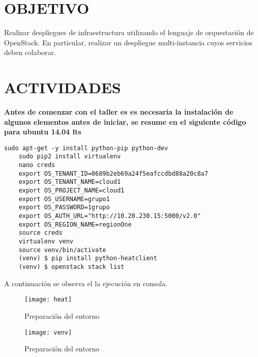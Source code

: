 \documentclass[10pt]{article}   			%
\begin{document}
	
\section{OBJETIVO}
Realizar despliegues de infraestructura utilizando el lenguaje de orquestación de OpenStack. En particular, realizar un despliegue multi-instancia cuyos servicios deben colaborar.
\section{ACTIVIDADES}	

\textbf{Antes de comenzar con el taller es es necesaria la instalación de algunos elementos antes de iniciar, se resume en el siguiente código para ubuntu 14.04 lts}
\begin{small}
	\begin{lstlisting}[frame=single]	
	sudo apt-get -y install python-pip python-dev
	sudo pip2 install virtualenv
	nano creds
	export OS_TENANT_ID=0689b2eb69a24f5eafccdbd88a20c8a7
	export OS_TENANT_NAME=cloud1
	export OS_PROJECT_NAME=cloud1
	export OS_USERNAME=grupo1
	export OS_PASSWORD=1grupo
	export OS_AUTH_URL="http://10.20.230.15:5000/v2.0"
	export OS_REGION_NAME=regionOne
	source creds
	virtualenv venv
	source venv/bin/activate
	(venv) $ pip install python-heatclient
	(venv) $ openstack stack list	
	\end{lstlisting}
\end{small}
\newpage
A continuación se observa el la ejecución en consola.\\


\begin{figure}[ht]
	\centering
	\texttt{[image: heat]}  
	\caption{Preparación del entorno} \label{fig:Elementos}
\end{figure}

\begin{figure}[ht]
	\centering
	\texttt{[image: venv]}  
	\caption{Preparación del entorno} \label{fig:Elementos}
\end{figure}
\end{document}
